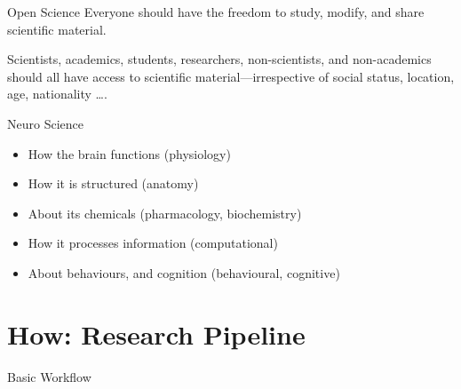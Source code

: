 

\begin{frame}
  \titlepage{}
\end{frame}

\begin{frame}[c]{Open Science}
	\alert{Everyone} should have the freedom to \alert{study, modify, and share} scientific material\footnotemark.
	\pause{}
	
	Scientists, academics, students, researchers, \alert{non-scientists, and non-academics} should all have access to scientific material---irrespective of social status, location, age, nationality \ldots.

\end{frame}

\begin{frame}[c]{Neuro Science}
	\begin{itemize}
		\item How the brain functions (\textcolor{FriendsMagenta}{physiology})
		\pause
		\item How it is structured (\textcolor{FriendsMagenta}{anatomy})
		\pause
		\item About its chemicals (\textcolor{FriendsMagenta}{pharmacology, biochemistry})
		\pause
		\item How it processes information (\textcolor{FriendsMagenta}{computational})
		\pause
		\item About behaviours, and cognition (\textcolor{FriendsMagenta}{behavioural, cognitive})
	\end{itemize}
\end{frame}

\section{How: Research Pipeline}

\begin{frame}[c]{Basic Workflow}
	\begin{figure}[h]
		\centering
		\only<1>{}
	\end{figure}
\end{frame}

